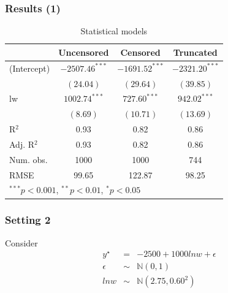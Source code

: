 \documentclass{beamer}
\newcommand{\1}{\mathbb{1}}
\newcommand{\N}{\mathbb{N}}
\begin{document}
\begin{frame}\frametitle{Results (1)}
\begin{table}
\tiny
\begin{center}
\begin{tabular}{l c c c }
\hline
 & Uncensored & Censored & Truncated \\
\hline
(Intercept) & $-2507.46^{***}$ & $-1691.52^{***}$ & $-2321.20^{***}$ \\
            & $(24.04)$        & $(29.64)$        & $(39.85)$        \\
lw          & $1002.74^{***}$  & $727.60^{***}$   & $942.02^{***}$                 \\
            & $(8.69)$         & $(10.71)$        & $(13.69)$                  \\
\hline
R$^2$       & 0.93             & 0.82             & 0.86             \\
Adj. R$^2$  & 0.93             & 0.82             & 0.86             \\
Num. obs.   & 1000             & 1000             & 744              \\
RMSE        & 99.65            & 122.87           & 98.25            \\
\hline
\multicolumn{4}{l}{\scriptsize{$^{***}p<0.001$, $^{**}p<0.01$, $^*p<0.05$}}
\end{tabular}
\caption{Statistical models}
\end{center}
\end{table}
\end{frame}

\begin{frame}\frametitle{Setting 2}
Consider 
\begin{eqnarray}
y^{\star} &=& -2500 + 1000 lnw + \epsilon\\
\epsilon &\sim& \N(0,1)\\
lnw &\sim& \N(2.75,0.60^2)
\end{eqnarray}
\end{frame}
\end{document}
